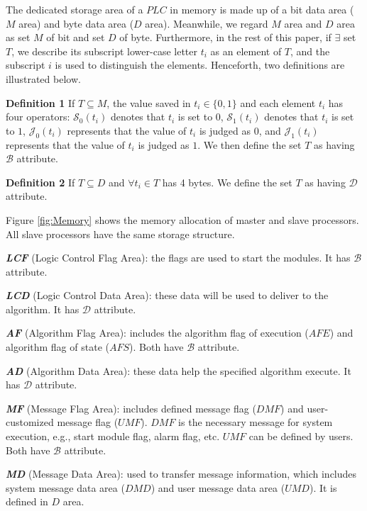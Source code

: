 \documentclass[journal,UTF8]{IEEEtran}
\begin{document}
	The dedicated storage area of a $PLC$ in memory is made up of a bit data area ($M$ area) and byte data area ($D$ area). Meanwhile, we regard $M$ area and $D$ area as set $M$ of bit and set $D$ of byte. Furthermore, in the rest of this paper, if $\exists$ set $T$, we describe its subscript lower-case letter $t_i$ as an element of $T$, and the subscript $i$ is used to distinguish the elements. Henceforth, two definitions are illustrated below.
	
	\textbf{Definition 1} If $ T \subseteq M$, the value saved in $t_{i} \in \{0, 1\} $ and each element $t_i$ has four operators: $\mathcal{S}_0(t_i)$ denotes that $t_i$ is set to $0$, $\mathcal{S}_1(t_i)$ denotes that $t_i$ is set to $1$, $\mathcal{J}_0(t_i)$ represents that the value of $t_i$ is judged as $0$, and $\mathcal{J}_1(t_i)$ represents that the value of $t_i$ is judged as $1$. We then define the set $T$ as having $\mathcal{B}$ attribute.
	
	\textbf{Definition 2} If $ T \subseteq D$ and $\forall t_{i} \in T$ has 4 bytes. We define the set $T$ as having $\mathcal{D}$ attribute.
	
	
	Figure \ref{fig:Memory} shows the memory allocation of master and slave processors. All slave processors have the same storage structure.
	
	\textbf{\emph{LCF}} (Logic Control Flag Area): the flags are used to start the modules. It has $\mathcal{B}$ attribute.
	
	\textbf{\emph{LCD}} (Logic Control Data Area): these data will be used to deliver to the algorithm. It has $\mathcal{D}$ attribute.
	
	\textbf{\emph{AF}} (Algorithm Flag Area): includes the algorithm flag of execution ($AFE$) and algorithm flag of state ($AFS$). Both have $\mathcal{B}$ attribute.
	
	\textbf{\emph{AD}} (Algorithm Data Area): these data help the specified algorithm execute. It has $\mathcal{D}$ attribute.
	
	\textbf{\emph{MF}} (Message Flag Area): includes defined message flag ($DMF$) and user-customized message flag ($UMF$). $DMF$ is the necessary message for system execution, e.g., start module flag, alarm flag, etc. $UMF$ can be defined by users. Both have $\mathcal{B}$ attribute.
	
	\textbf{\emph{MD}} (Message Data Area): used to transfer message information, which includes system message data area ($DMD$) and user message data area ($UMD$). It is defined in $D$ area.
	
\end{document}
